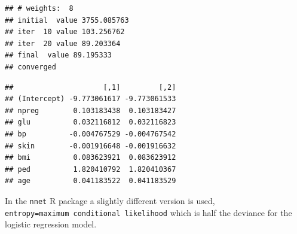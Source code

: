 \documentclass[10pt,ignorenonframetext,]{beamer}
\newenvironment{Shaded}{\begin{snugshade}}{\end{snugshade}}
\newcommand{\KeywordTok}[1]{\textcolor[rgb]{0.13,0.29,0.53}{\textbf{#1}}}
\newcommand{\DataTypeTok}[1]{\textcolor[rgb]{0.13,0.29,0.53}{#1}}
\newcommand{\DecValTok}[1]{\textcolor[rgb]{0.00,0.00,0.81}{#1}}
\newcommand{\FloatTok}[1]{\textcolor[rgb]{0.00,0.00,0.81}{#1}}
\newcommand{\StringTok}[1]{\textcolor[rgb]{0.31,0.60,0.02}{#1}}
\newcommand{\CommentTok}[1]{\textcolor[rgb]{0.56,0.35,0.01}{\textit{#1}}}
\newcommand{\OtherTok}[1]{\textcolor[rgb]{0.56,0.35,0.01}{#1}}
\newcommand{\OperatorTok}[1]{\textcolor[rgb]{0.81,0.36,0.00}{\textbf{#1}}}
\newcommand{\NormalTok}[1]{#1}
\begin{document}
\begin{frame}[fragile]

\scriptsize

\begin{Shaded}
\end{Shaded}

\begin{verbatim}
## # weights:  8
## initial  value 3755.085763 
## iter  10 value 103.256762
## iter  20 value 89.203364
## final  value 89.195333 
## converged
\end{verbatim}

\begin{Shaded}
\end{Shaded}

\begin{verbatim}
##                     [,1]         [,2]
## (Intercept) -9.773061617 -9.773061533
## npreg        0.103183438  0.103183427
## glu          0.032116812  0.032116823
## bp          -0.004767529 -0.004767542
## skin        -0.001916648 -0.001916632
## bmi          0.083623921  0.083623912
## ped          1.820410792  1.820410367
## age          0.041183522  0.041183529
\end{verbatim}

In the \texttt{nnet} R package a slightly different version is used,
\texttt{entropy=maximum\ conditional\ likelihood} which is half the
deviance for the logistic regression model.

\end{frame}
\end{document}
